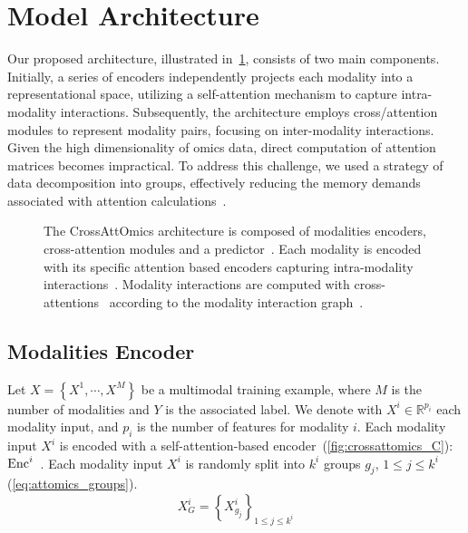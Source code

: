 \documentclass[../main.tex]{subfiles}
\begin{document}
\section{Model Architecture}
	Our proposed architecture, illustrated in~\cref{fig:crossattomics_arch}, consists of two main components.
	Initially, a series of encoders independently projects each modality into a representational space, utilizing a self-attention mechanism to capture intra-modality interactions.
	Subsequently, the architecture employs cross\-/attention modules to represent modality pairs, focusing on inter-modality interactions.
	Given the high dimensionality of omics data, direct computation of attention matrices becomes impractical.
	To address this challenge, we used a strategy of data decomposition into groups, effectively reducing the memory demands associated with attention calculations~\cite{AttOmics}.

	\begin{figure}[htbp]
	    \begin{subcaptiongroup}
	        \ifSubfilesClassLoaded{%
	        }{
	        }
	        \label{fig:crossattomics_A}
	        \label{fig:crossattomics_B}
	        \label{fig:crossattomics_C}
	        \label{fig:crossattomics_D}
	    \end{subcaptiongroup}

	    \caption[The CrossAttOmics architecture]{The CrossAttOmics architecture is composed of modalities encoders, cross-attention modules and a predictor~. Each modality is encoded with its specific attention based encoders capturing intra-modality interactions~. Modality interactions are computed with cross-attentions~ according to the modality interaction graph~.}
	    \label{fig:crossattomics_arch}
	\end{figure}

	\subsection{Modalities Encoder}
	    Let \( X = \left\{X^{1}, \cdots, X^{M} \right\} \) be a multimodal training example, where \(M\) is the number of modalities and \(Y\) is the associated label.
	    We denote with \(X^{i} \in \mathbb{R}^{p_i}\) each modality input, and \(p_i\) is the number of features for modality \(i\).
	    Each modality input \(X^{i}\) is encoded with a self-attention-based encoder~(\cref{fig:crossattomics_C}): \(\operatorname{Enc}^{i}\)~\cite{AttOmics}.
	    Each modality input \(X^i\) is randomly split into \(k^i\) groups \(g_j\), \(1\leq j \leq k^i\)  (\cref{eq:attomics_groups}).
	    \begin{equation}
	        X^{i}_{G} = \left\{X^{i}_{g_j} \right\}_{1\leq j\leq k^i}\label{eq:attomics_groups}
	    \end{equation}
\end{document}
